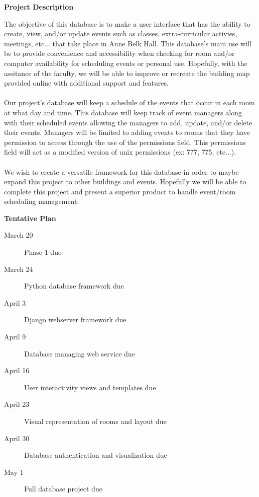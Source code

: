 \documentclass{article}
\begin{document}
\begin{center}\textbf{\large Project Description}\end{center}
The objective of this database is to make a user interface that has the ability to create, view, and/or update events such as classes, extra-curricular activies, meetings, etc... that take place in Anne Belk Hall. This database's main use will be to provide convenience and accessibility when checking for room and/or computer availability for scheduling events or personal use. Hopefully, with the assitance of the faculty, we will be able to improve or recreate the building map provided online with additional support and features.\\\\
Our project's database will keep a schedule of the events that occur in each room at what day and time. This database will keep track of event managers along with their scheduled events allowing the managers to add, update, and/or delete their events. Managers will be limited to adding events to rooms that they have permission to access through the use of the permissions field. This permissions field will act as a modified version of unix permissions (ex: 777, 775, etc...).\\\\
We wish to create a versatile framework for this database in order to maybe expand this project to other buildings and events. Hopefully we will be able to complete this project and present a superior product to handle event/room scheduling management.
\\\hline
\begin{center}\textbf{\large Tentative Plan}\end{center}
\begin{description}
    \item[March 20] \hfill Phase 1 due
    \item[March 24]\hfill  Python database framework due
    \item[April 3]\hfill  Django webserver framework due
    \item[April 9]\hfill  Database managing web service due
    \item[April 16] \hfill User interactivity views and templates due
    \item[April 23] \hfill Visual representation of rooms and layout due
    \item[April 30] \hfill Database authentication and visualization due
    \item[May 1]\hfill  Full database project due
\end{description}
\end{document}
